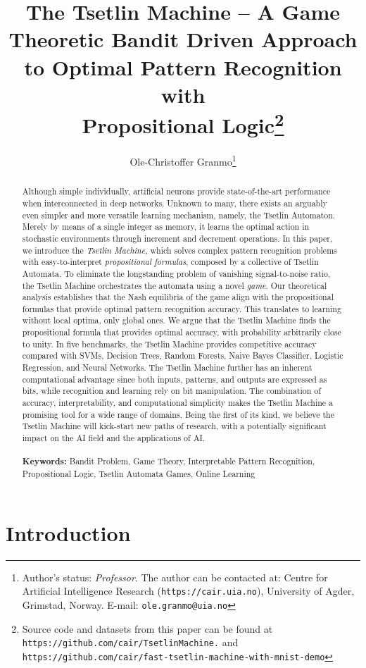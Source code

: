 \documentclass[11pt,a4paper]{article}
\title{The Tsetlin Machine -- A Game Theoretic Bandit Driven Approach to Optimal Pattern Recognition with\\Propositional Logic\footnote{Source code and datasets from this paper can be found at {\tt https://github.com/cair/TsetlinMachine.} and {\tt https://github.com/cair/fast-tsetlin-machine-with-mnist-demo}}}
\author{Ole-Christoffer Granmo\thanks{Author's status: {\it Professor}. The author can be contacted at: Centre for Artificial Intelligence Research ({\tt https://cair.uia.no}), University of Agder, Grimstad, Norway.  E-mail: {\tt ole.granmo@uia.no}}}
\date{}
\begin{document}
\maketitle

\begin{abstract}
Although simple individually, artificial neurons provide state-of-the-art performance when interconnected in deep networks. Unknown to many, there exists an arguably even simpler and more versatile learning mechanism, namely, the Tsetlin Automaton. Merely by means of a single integer as memory, it learns the optimal action in stochastic environments through increment and decrement operations. In this paper, we introduce the \emph{Tsetlin Machine}, which solves complex pattern recognition problems with easy-to-interpret \emph{propositional formulas}, composed by a collective of Tsetlin Automata. To eliminate the longstanding problem of vanishing signal-to-noise ratio, the Tsetlin Machine orchestrates the automata using a novel \emph{game}. Our theoretical analysis establishes that the Nash equilibria of the game align with the propositional formulas that provide optimal pattern recognition accuracy. This translates to learning without local optima, only global ones. We argue that the Tsetlin Machine finds the propositional formula that provides optimal accuracy, with probability arbitrarily close to unity. In five benchmarks, the Tsetlin Machine provides competitive accuracy compared with SVMs, Decision Trees, Random Forests, Naive Bayes Classifier, Logistic Regression, and Neural Networks. The Tsetlin Machine further has an inherent computational advantage since both inputs, patterns, and outputs are expressed as bits, while recognition and learning rely on bit manipulation. The combination of accuracy, interpretability, and computational simplicity makes the Tsetlin Machine a promising tool for a wide range of domains. Being the first of its kind, we believe the Tsetlin Machine will kick-start new paths of research, with a potentially significant impact on the AI field and the applications of AI.\\\\
{\bf Keywords:} Bandit Problem, Game Theory, Interpretable Pattern Recognition, Propositional Logic, Tsetlin Automata Games, Online Learning 
\end{abstract}

\section{Introduction}
\end{document}
